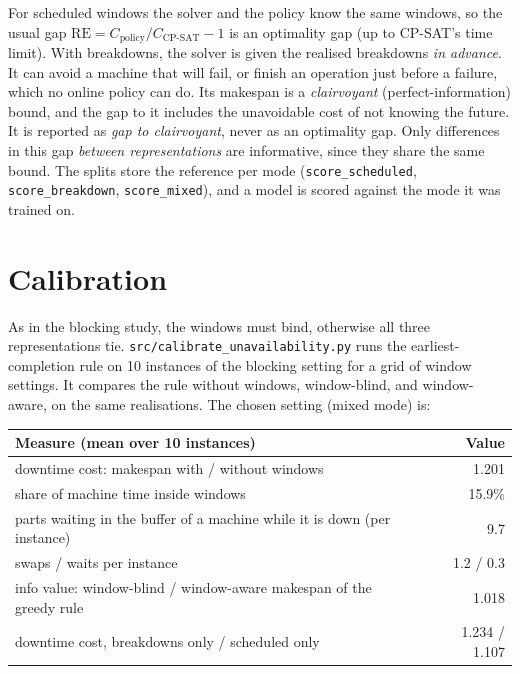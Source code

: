 \documentclass[11pt,a4paper]{article}
\newcommand{\RE}{\mathrm{RE}}
\newcommand{\code}[1]{\texttt{#1}}
\begin{document}
For scheduled windows the solver and the policy know the same windows, so the usual gap
$\RE=C_{\text{policy}}/C_{\text{CP-SAT}}-1$ is an optimality gap (up to CP-SAT's time limit).
With breakdowns, the solver is given the realised breakdowns \emph{in advance}. It can avoid a
machine that will fail, or finish an operation just before a failure, which no online policy
can do. Its makespan is a \emph{clairvoyant} (perfect-information) bound, and the gap to it
includes the unavoidable cost of not knowing the future. It is reported as \emph{gap to
clairvoyant}, never as an optimality gap. Only differences in this gap \emph{between
representations} are informative, since they share the same bound. The splits store the
reference per mode (\code{score\_scheduled}, \code{score\_breakdown}, \code{score\_mixed}), and
a model is scored against the mode it was trained on.

\section{Calibration}

As in the blocking study, the windows must bind, otherwise all three representations tie.
\code{src/calibrate\_unavailability.py} runs the earliest-completion rule on 10 instances of
the blocking setting for a grid of window settings. It compares the rule without windows,
window-blind, and window-aware, on the same realisations. The chosen setting (mixed mode) is:
\begin{center}
\begin{tabular}{@{}lr@{}}
\toprule
Measure (mean over 10 instances) & Value \\
\midrule
downtime cost: makespan with / without windows & 1.201 \\
share of machine time inside windows & 15.9\% \\
parts waiting in the buffer of a machine while it is down (per instance) & 9.7 \\
swaps / waits per instance & 1.2 / 0.3 \\
info value: window-blind / window-aware makespan of the greedy rule & 1.018 \\
\midrule
downtime cost, breakdowns only / scheduled only & 1.234 / 1.107 \\
\bottomrule
\end{tabular}
\end{center}
\end{document}
